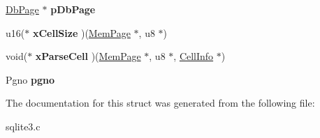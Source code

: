 \begin{DoxyCompactItemize}
\item 
\hyperlink{structPgHdr}{Db\+Page} $\ast$ {\bfseries p\+Db\+Page}\hypertarget{structMemPage_add322c1aed91e95d8dfe3ac3535d65b4}{}\label{structMemPage_add322c1aed91e95d8dfe3ac3535d65b4}

\item 
u16($\ast$ {\bfseries x\+Cell\+Size} )(\hyperlink{structMemPage}{Mem\+Page} $\ast$, u8 $\ast$)\hypertarget{structMemPage_aecb022d01630da5a48681f8a7e32a419}{}\label{structMemPage_aecb022d01630da5a48681f8a7e32a419}

\item 
void($\ast$ {\bfseries x\+Parse\+Cell} )(\hyperlink{structMemPage}{Mem\+Page} $\ast$, u8 $\ast$, \hyperlink{structCellInfo}{Cell\+Info} $\ast$)\hypertarget{structMemPage_ac401be6009d535d9fef9cc48af734039}{}\label{structMemPage_ac401be6009d535d9fef9cc48af734039}

\item 
Pgno {\bfseries pgno}\hypertarget{structMemPage_ad2b0c532abc799bbcf3b43df4f0b0546}{}\label{structMemPage_ad2b0c532abc799bbcf3b43df4f0b0546}

\end{DoxyCompactItemize}


The documentation for this struct was generated from the following file\+:\begin{DoxyCompactItemize}
\item 
sqlite3.\+c\end{DoxyCompactItemize}
